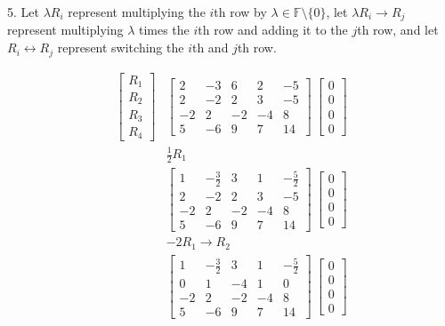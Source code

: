 \documentclass[11pt]{article}
\newcommand{\F}{\mathbb{F}}
\begin{document}
\begin{flushleft}
\newpage

5.
Let $\lambda R_i$ represent multiplying the $i$th row by $\lambda \in \F \setminus \{ 0 \}$, let $\lambda R_i \rightarrow R_j$ represent multiplying $\lambda$ times the $i$th row and adding it to the $j$th row, and let $R_i \leftrightarrow R_j$ represent switching the $i$th and $j$th row.

\begin{align*}
\begin{bmatrix}
R_1 \\ R_2 \\ R_3 \\ R_4
\end{bmatrix}
&\begin{bmatrix}
2 & -3 & 6 & 2 & -5 \\
2 & -2 & 2 & 3 & -5 \\
-2 & 2 & -2 & -4 & 8 \\
5 & -6 & 9 & 7 & 14
\end{bmatrix}\
\begin{bmatrix}
0 \\ 0 \\ 0 \\ 0
\end{bmatrix}\\
&\frac{1}{2}R_1\\
&\begin{bmatrix}
1 & -\frac{3}{2} & 3 & 1 & -\frac{5}{2} \\
2 & -2 & 2 & 3 & -5 \\
-2 & 2 & -2 & -4 & 8 \\
5 & -6 & 9 & 7 & 14
\end{bmatrix}\
\begin{bmatrix}
0 \\ 0 \\ 0 \\ 0
\end{bmatrix}\\
&-2 R_1 \rightarrow R_2 \\
&\begin{bmatrix}
1 & -\frac{3}{2} & 3 & 1 & -\frac{5}{2} \\
0 & 1 & -4 & 1 & 0 \\
-2 & 2 & -2 & -4 & 8 \\
5 & -6 & 9 & 7 & 14
\end{bmatrix}\
\begin{bmatrix}
0 \\ 0 \\ 0 \\ 0
\end{bmatrix}\\

\end{align*}
\end{flushleft}
\end{document}
